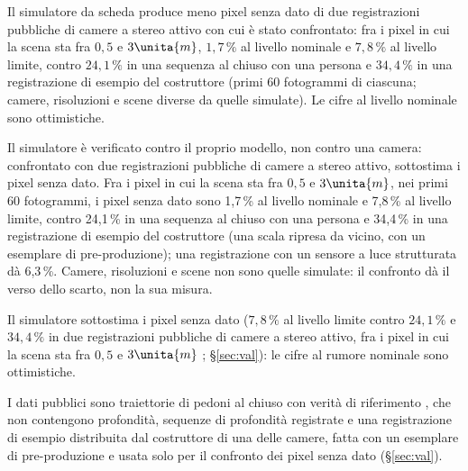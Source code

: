 Il simulatore da scheda produce meno pixel senza dato di due registrazioni pubbliche di camere a stereo attivo con cui è stato confrontato: fra i pixel in cui la scena sta fra $0{,}5$ e $3\unita{m}$, $1{,}7\,\%$ al livello nominale e $7{,}8\,\%$ al livello limite, contro $24{,}1\,\%$ in una sequenza al chiuso con una persona \cite{depthtrack} e $34{,}4\,\%$ in una registrazione di esempio del costruttore (primi 60 fotogrammi di ciascuna; camere, risoluzioni e scene diverse da quelle simulate). Le cifre al livello nominale sono ottimistiche.

Il simulatore è verificato contro il proprio modello, non contro una camera: confrontato con due registrazioni pubbliche di camere a stereo attivo, sottostima i pixel senza dato. Fra i pixel in cui la scena sta fra $0{,}5$ e $3\unita{m}$, nei primi 60 fotogrammi, i pixel senza dato sono 1,7\,\% al livello nominale e 7,8\,\% al livello limite, contro 24,1\,\% in una sequenza al chiuso con una persona \cite{depthtrack} e 34,4\,\% in una registrazione di esempio del costruttore (una scala ripresa da vicino, con un esemplare di pre-produzione); una registrazione con un sensore a luce strutturata \cite{tum-rgbd} dà 6,3\,\%. Camere, risoluzioni e scene non sono quelle simulate: il confronto dà il verso dello scarto, non la sua misura.

Il simulatore sottostima i pixel senza dato ($7{,}8\,\%$ al livello limite contro $24{,}1\,\%$ e $34{,}4\,\%$ in due registrazioni pubbliche di camere a stereo attivo, fra i pixel in cui la scena sta fra $0{,}5$ e $3\unita{m}$ ; \S\ref{sec:val}): le cifre al rumore nominale sono ottimistiche.

I dati pubblici sono traiettorie di pedoni al chiuso con verità di riferimento \cite{thor}, che non contengono profondità, sequenze di profondità registrate \cite{tum-rgbd,depthtrack} e una registrazione di esempio distribuita dal costruttore di una delle camere, fatta con un esemplare di pre-produzione e usata solo per il confronto dei pixel senza dato (\S\ref{sec:val}).

